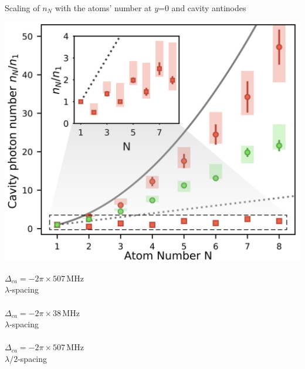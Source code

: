 \documentclass{beamer}
\begin{document}
\begin{frame}{Scaling of $n_N$ with the atoms' number {\tiny at $y$=0 and cavity antinodes}}
	\begin{minipage}{0.68\textwidth}
		\centering
		\includegraphics[width=\textwidth]{Figure_3a.png}
	\end{minipage}
	\begin{minipage}{0.31\textwidth}
		\textcolor[rgb]{0.859, 0.420, 0.329}{$\Delta_{ca}=-2\pi\times 507\,$MHz\\$\lambda$-spacing}\\
		\vspace{2.2em}
		\textcolor[rgb]{0.529, 0.851, 0.455}{\\$\Delta_{ca}=-2\pi\times 38\,$MHz\\$\lambda$-spacing}\\
		\vspace{2.5em}
		\textcolor[rgb]{0.859, 0.420, 0.329}{\\ $\Delta_{ca}=-2\pi\times 507\,$MHz\\$\lambda/2$-spacing}\\
	\end{minipage}
\end{frame}
\end{document}
